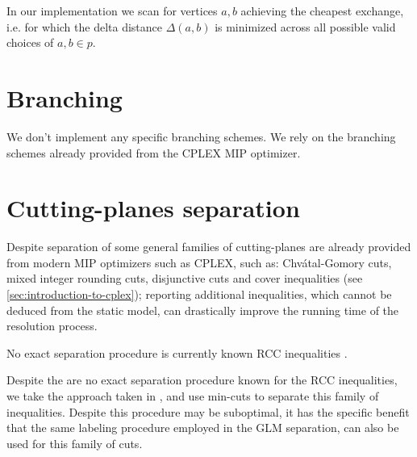 In our implementation
we scan for vertices $a, b$ achieving the cheapest exchange,
i.e. for which the delta distance $\Delta(a, b)$ is minimized across all possible valid choices of $a, b \in p$.

\section{Branching}
\label{sec:impl-branching}

We don't implement any specific branching schemes.
We rely on the branching schemes already provided from the CPLEX MIP optimizer.


\section{Cutting-planes separation}
\label{sec:impl-separation-techniques}

Despite separation of some general families of cutting-planes are already provided
from modern MIP optimizers such as CPLEX, such as:
Chvátal-Gomory cuts, mixed integer rounding cuts, disjunctive cuts
and cover inequalities (see \cref{sec:introduction-to-cplex});
reporting additional inequalities, which cannot be deduced from the static model,
can drastically improve the running time of the resolution process.


No exact separation procedure is currently known RCC inequalities \parencite{jepsen2014}.

Despite the are no exact separation procedure known for the RCC inequalities,
we take the approach taken in \textcite{jepsen2014},
and use min-cuts to separate this family of inequalities.
Despite this procedure may be suboptimal, it has the specific
benefit that the same labeling procedure employed in the GLM separation,
can also be used for this family of cuts.

